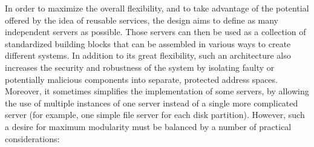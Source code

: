 In order to maximize the overall flexibility, and to take advantage of
the potential offered by the idea of reusable services, the design
aims to define as many independent servers as possible. Those servers
can then be used as a collection of standardized building blocks that
can be assembled in various ways to create different systems. In
addition to its great flexibility, such an architecture also increases
the security and robustness of the system by isolating faulty or
potentially malicious components into separate, protected address
spaces. Moreover, it sometimes simplifies the implementation of some
servers, by allowing the use of multiple instances of one server
instead of a single more complicated server (for example, one simple
file server for each disk partition). However, such a desire for
maximum modularity must be balanced by a number of practical
considerations:
